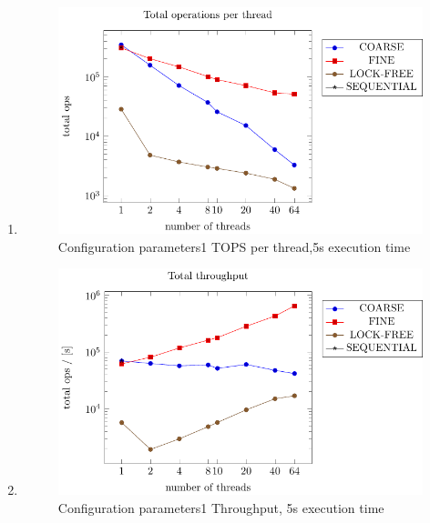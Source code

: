 \documentclass{article}
\begin{document}
\begin{enumerate}
    \item 
    \begin{figure}[H]
        \centering
        \includegraphics{../plots/parameters1_5s_per_thread.pdf}
        \caption{Configuration parameters1 TOPS per thread,5s execution time}
       
        \label{fig:parameters1_5s_per_thread}
    \end{figure}


    \item
    \begin{figure}[H]
        \centering
        \includegraphics{../plots/parameters1_5s_throughput.pdf}
        \caption{Configuration parameters1 Throughput, 5s execution time}
        \label{fig:parameters1_5s_throughput}
    \end{figure}


\end{enumerate}
\end{document}
